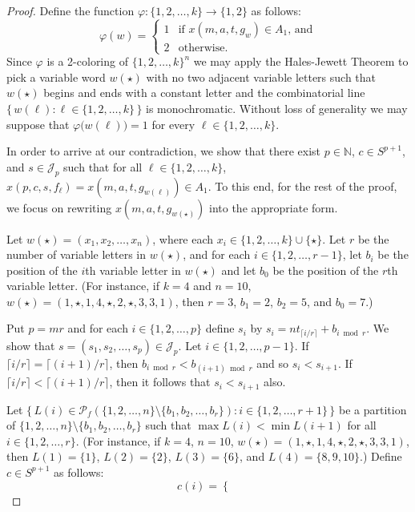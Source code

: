 \documentclass[12pt]{article}
\theoremstyle{plain}
\theoremstyle{definition}
\newcommand{\bbN}{\mathbb{N}}
\newcommand{\calJ}{\mathcal{J}}
\newcommand{\Pf}{\mathcal{P}_f}
\begin{document}
\begin{proof}
  Define the function $\varphi \colon \{1, 2, \ldots, k\} \to \{1, 2\}$ as follows:
  \[
    \varphi(w) = 
    \begin{cases}
      1 & \mbox{if $x(m, a, t, g_w) \in A_1$, and} \\
      2 & \mbox{otherwise.}
    \end{cases}
  \]
  Since $\varphi$ is a 2-coloring of $\{1, 2, \ldots, k\}^n$ we may apply the Hales-Jewett Theorem to pick a variable word $w(\star)$ with no two adjacent variable letters such that $w(\star)$ begins and ends with a constant letter and the combinatorial line $\bigl\{\, w(\ell) : \ell \in \{1, 2, \ldots, k\} \,\bigr\}$ is monochromatic. 
  Without loss of generality we may suppose that $\varphi \bigl( w(\ell) \bigr) = 1$ for every $\ell \in \{1, 2, \ldots, k\}$.

  In order to arrive at our contradiction, we show that there exist $p \in \bbN$, $c \in S^{p+1}$, and $s \in \calJ_p$ such that for all $\ell \in \{1, 2, \ldots, k\}$, $ x(p, c, s, f_\ell) = x(m, a, t, g_{w(\ell)}) \in A_1$. 
  To this end, for the rest of the proof, we focus on rewriting $x(m, a, t, g_{w(\star)})$ into the appropriate form. 

  Let $w(\star) = (x_1, x_2, \ldots, x_n)$, where each $x_i \in \{1, 2, \ldots, k\} \cup \{\star\}$. 
  Let $r$ be the number of variable letters in $w(\star)$, and for each $i \in \{1, 2, \ldots, r-1\}$, let $b_i$ be the position of the \mbox{$i$th} variable letter in $w(\star)$ and let $b_0$ be the position of the \mbox{$r$th} variable letter.
  (For instance, if $k = 4$ and $n = 10$, $w(\star) = (1, \star, 1, 4, \star, 2, \star, 3, 3, 1)$, then $r = 3$, $b_1 = 2$, $b_2 = 5$, and $b_0 = 7$.)

  Put $p = mr$ and for each $i \in \{1, 2, \ldots, p\}$ define $s_i$ by $s_i = nt_{\lceil i/r \rceil} + b_{i \bmod r}$.
  We show that $s = (s_1, s_2, \ldots, s_p) \in \calJ_p$.
  Let $i \in \{1, 2, \ldots, p-1\}$.
  If $\lceil i/r \rceil = \lceil (i+1)/r \rceil$, then $b_{i \bmod r} < b_{(i+1) \bmod r}$ and so $s_i < s_{i+1}$.
  If $\lceil i/r \rceil < \lceil (i+1)/r \rceil$, then it follows that $s_i < s_{i+1}$ also.

  Let $\bigl\{\, L(i) \in \Pf(\{1, 2, \ldots, n\} \setminus \{b_1, b_2, \ldots, b_r\}) : i \in \{1, 2, \ldots, r+1\} \,\bigr\}$ be a partition of $\{1, 2, \ldots, n\} \setminus \{b_1, b_2, \ldots, b_r\}$ such that $\max L(i) < \min L(i+1)$ for all $i \in \{1, 2, \ldots, r\}$.
  (For instance, if $k = 4$, $n = 10$, $w(\star) = (1, \star, 1, 4, \star, 2, \star, 3, 3, 1)$, then $L(1) = \{1\}$, $L(2) = \{2\}$, $L(3) = \{6\}$, and $L(4) = \{8, 9, 10\}$.)
  Define $c \in S^{p+1}$ as follows:
  \[
    c(i) = 
    \begin{cases}
      

\end{cases}\]
\end{proof}
\end{document}
